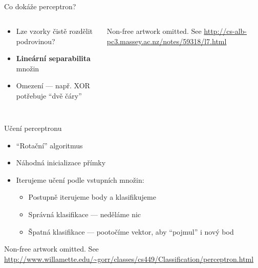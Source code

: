 \documentclass{beamer}
\begin{document}
\subsection{}
\begin{frame}{Co dokáže perceptron?}
\begin{columns}
\begin{column}{7cm}
\begin{itemize}
\item Lze vzorky čistě rozdělit podrovinou?
\item {\bf Lineární separabilita} množin
\item Omezení --- např. XOR potřebuje ``dvě čáry''
\end{itemize}
\end{column}
\begin{column}{4cm}
Non-free artwork omitted. See
\url{http://cs-alb-pc3.massey.ac.nz/notes/59318/l7.html}
\end{column}
\end{columns}
\end{frame}

\subsection{}
\begin{frame}{Učení perceptronu}
\begin{itemize}
\item ``Rotační'' algoritmus
\item Náhodná inicializace přímky
\item Iterujeme učení podle vstupních množin:
\begin{itemize}
\item Postupně iterujeme body a klasifikujeme
\item Správná klasifikace --- neděláme nic
\item Špatná klasifikace --- pootočíme vektor, aby ``pojmul'' i nový bod
\end{itemize}
\end{itemize}

Non-free artwork omitted.
See \url{http://www.willamette.edu/~gorr/classes/cs449/Classification/perceptron.html}
\end{frame}
\end{document}
